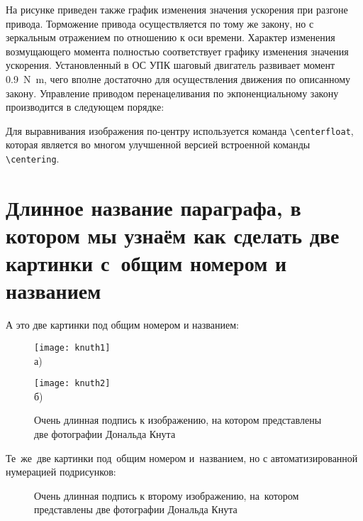 На рисунке приведен также график изменения значения ускорения при разгоне привода. Торможение привода осуществляется по тому же закону, но с зеркальным отражением по отношению к оси времени. Характер изменения возмущающего момента полностью соответствует графику изменения значения ускорения. Установленный в ОС УПК шаговый двигатель развивает момент \SI{0,9}{\newton\meter}, чего вполне достаточно для осуществления движения по описанному закону.
Управление приводом перенацеливания по экпоненциальному закону производится в следующем порядке:






Для выравнивания изображения по-центру используется команда \verb+\centerfloat+, которая является во
многом улучшенной версией встроенной команды \verb+\centering+.

\section{Длинное название параграфа, в котором мы узнаём как сделать две картинки с~общим номером и названием}\label{sec:ch2/sect2}

А это две картинки под общим номером и названием:
\begin{figure}[ht]
    \begin{minipage}[b][][b]{0.49\linewidth}\centering
        \texttt{[image: knuth1]} \\ а)
    \end{minipage}
    \hfill
    \begin{minipage}[b][][b]{0.49\linewidth}\centering
        \texttt{[image: knuth2]} \\ б)
    \end{minipage}
    \caption{Очень длинная подпись к изображению,
        на котором представлены две фотографии Дональда Кнута}
    \label{fig:knuth}
\end{figure}

Те~же~две картинки под~общим номером и~названием,
но с автоматизированной нумерацией подрисунков:
\begin{figure}[ht]
    \caption[Этот текст попадает в названия рисунков в списке рисунков]{Очень
        длинная подпись к второму изображению, на~котором представлены две
        фотографии Дональда Кнута}\label{fig:knuth_2}
\end{figure}

